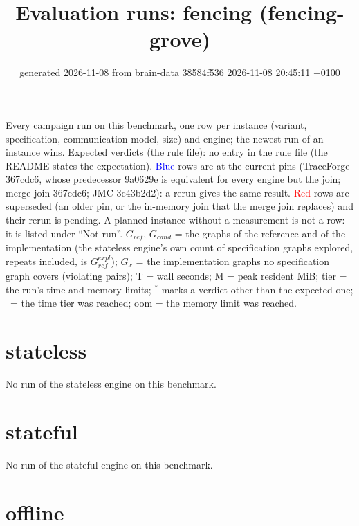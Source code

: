 \documentclass[10pt]{article}
\title{Evaluation runs: \textsf{fencing} (fencing-grove)}
\author{}
\date{generated 2026-11-08 from brain-data 38584f536 2026-11-08 20:45:11 +0100}
\begin{document}
\maketitle\small
\noindent Every campaign run on this benchmark, one row per instance (variant, specification, communication model, size) and engine; the newest run of an instance wins. Expected verdicts (the rule file): no entry in the rule file (the README states the expectation). \textcolor{blue}{Blue} rows are at the current pins (TraceForge 367cdc6, whose predecessor 9a0629e is equivalent for every engine but the join; merge join 367cdc6; JMC 3c43b2d2): a rerun gives the same result. \textcolor{red}{Red} rows are superseded (an older pin, or the in-memory join that the merge join replaces) and their rerun is pending. A planned instance without a measurement is not a row: it is listed under ``Not run''. $G_{\mathit{ref}}$, $G_{\mathit{cand}}$ = the graphs of the reference and of the implementation (the stateless engine's own count of specification graphs explored, repeats included, is $G_{\mathit{ref}}^{\mathit{expl}}$); $G_x$ = the implementation graphs no specification graph covers (violating pairs); T = wall seconds; M = peak resident MiB; tier = the run's time and memory limits; $^{\ast}$ marks a verdict other than the expected one; \faClock\ = the time tier was reached; oom = the memory limit was reached.

\section*{stateless}\noindent No run of the stateless engine on this benchmark.
\section*{stateful}\noindent No run of the stateful engine on this benchmark.
\section*{offline}
\end{document}
